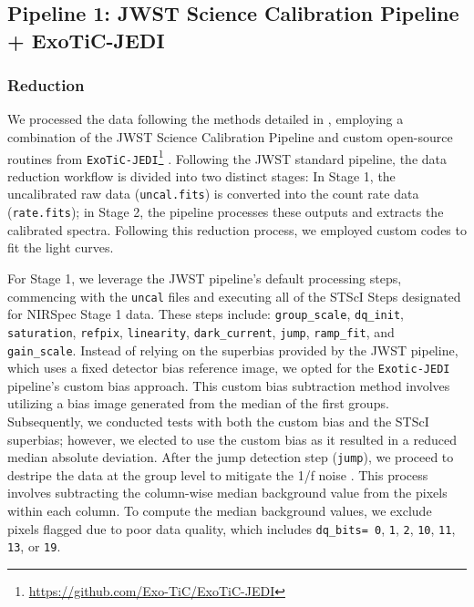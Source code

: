 \documentclass[twocolumn]{aastex63} %
\begin{document}
\subsection{Pipeline 1: JWST Science Calibration Pipeline 
+ ExoTiC-JEDI }\label{subsec:thao}
\subsubsection{Reduction}

We processed the data following the methods detailed in \citet{grant2023detection}, employing a combination of the JWST Science Calibration Pipeline and custom open-source routines from \texttt{ExoTiC-JEDI}\footnote{\url{https://github.com/Exo-TiC/ExoTiC-JEDI}} \citep[v.0.1-beta;][]{Alderson2023}. Following the JWST standard pipeline, the data reduction workflow is divided into two distinct stages: In Stage 1, the uncalibrated raw data (\texttt{uncal.fits}) is converted into the count rate data (\texttt{rate.fits}); in Stage 2, the pipeline processes these outputs and extracts the calibrated spectra. Following this reduction process, we employed custom codes to fit the light curves. 

For Stage 1, we leverage the JWST pipeline's default processing steps, commencing with the \texttt{uncal} files and executing all of the STScI Steps designated for NIRSpec Stage 1 data. These steps include: \texttt{group\_scale}, \texttt{dq\_init}, \texttt{saturation}, \texttt{refpix}, \texttt{linearity}, \texttt{dark\_current}, \texttt{jump}, \texttt{ramp\_fit}, and \texttt{gain\_scale}. Instead of relying on the superbias provided by the JWST pipeline, which uses a fixed detector bias reference image, we opted for the \texttt{Exotic-JEDI} pipeline's custom bias approach. This custom bias subtraction method involves utilizing a bias image generated from the median of the first groups. Subsequently, we conducted tests with both the custom bias and the STScI superbias; however, we elected to use the custom bias as it resulted in a reduced median absolute deviation. After the jump detection step (\texttt{jump}), we proceed to destripe the data at the group level to mitigate the 1/f noise \citep{rustamkulov2023early}. This process involves subtracting the column-wise median background value from the pixels within each column. To compute the median background values, we exclude pixels flagged due to poor data quality, which includes \texttt{dq\_bits= 0}, \texttt{1}, \texttt{2}, \texttt{10}, \texttt{11}, \texttt{13}, or \texttt{19}.
\end{document}
